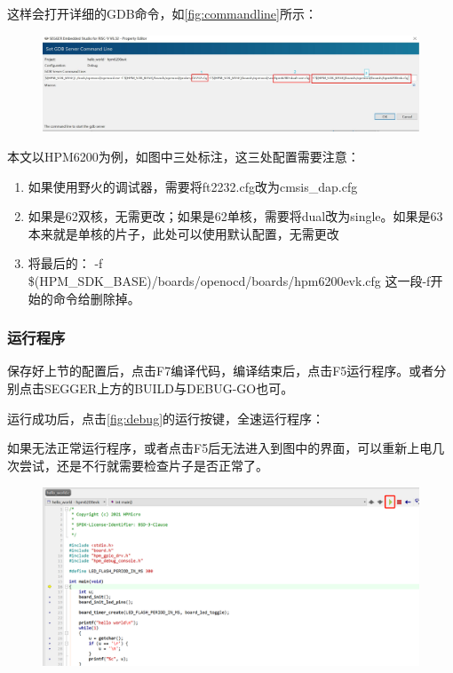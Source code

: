 \vspace{\baselineskip}
\vspace{0.2cm} 
这样会打开详细的GDB命令，如\autoref{fig:commandline}所示：\par
\vspace{\baselineskip}
\vspace{0.2cm}
\begin{figure}[H]
	\centering
	\includegraphics[width=1\linewidth]{img/commandline}
	\caption{}
	\label{fig:commandline}
\end{figure}
\vspace{\baselineskip}
\vspace{0.3cm} 

本文以HPM6200为例，如图中三处标注，这三处配置需要注意：\par
\begin{enumerate}
    \item  如果使用野火的调试器，需要将ft2232.cfg改为cmsis\_dap.cfg
    \item  如果是62双核，无需更改；如果是62单核，需要将dual改为single。如果是63本来就是单核的片子，此处可以使用默认配置，无需更改
    \item 将最后的： %
        -f \$(HPM\_SDK\_BASE)/boards/openocd/boards/hpm6200evk.cfg 
        这一段-f开始的命令给删除掉。 %
\end{enumerate}

\subsubsection{运行程序}
保存好上节的配置后，点击F7编译代码，编译结束后，点击F5运行程序。或者分别点击SEGGER上方的BUILD与DEBUG-GO也可。\par
运行成功后，点击\autoref{fig:debug}的运行按键，全速运行程序：\par
如果无法正常运行程序，或者点击F5后无法进入到图中的界面，可以重新上电几次尝试，还是不行就需要检查片子是否正常了。\par
\vspace{\baselineskip}
\vspace{0.3cm}
\begin{figure}[H]
	\centering
	\includegraphics[width=0.7\linewidth]{img/debug}
	\caption{}
	\label{fig:debug}
\end{figure}


